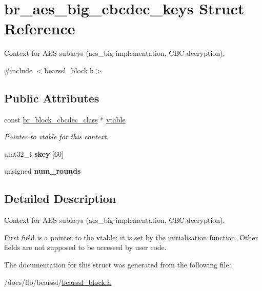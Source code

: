 \hypertarget{structbr__aes__big__cbcdec__keys}{}\section{br\+\_\+aes\+\_\+big\+\_\+cbcdec\+\_\+keys Struct Reference}
\label{structbr__aes__big__cbcdec__keys}


Context for A\+ES subkeys ({\ttfamily aes\+\_\+big} implementation, C\+BC decryption).  




{\ttfamily \#include $<$bearssl\+\_\+block.\+h$>$}

\subsection*{Public Attributes}
\begin{DoxyCompactItemize}
\item 
\mbox{\label{structbr__aes__big__cbcdec__keys_a379ffc6c76c3bcd68b976e460734a8a3}} 
const \hyperlink{bearssl__block_8h_a5542970c820eeee2e62766368be8fb7f}{br\+\_\+block\+\_\+cbcdec\+\_\+class} $\ast$ \hyperlink{structbr__aes__big__cbcdec__keys_a379ffc6c76c3bcd68b976e460734a8a3}{vtable}
\begin{DoxyCompactList}\small\item\em Pointer to vtable for this context. \end{DoxyCompactList}\item 
\mbox{\label{structbr__aes__big__cbcdec__keys_a2533d2054903920cfa6f312648004a74}} 
uint32\+\_\+t {\bfseries skey} \mbox{[}60\mbox{]}
\item 
\mbox{\label{structbr__aes__big__cbcdec__keys_aa7d5cf29a176319c68ce96da9695e63b}} 
unsigned {\bfseries num\+\_\+rounds}
\end{DoxyCompactItemize}


\subsection{Detailed Description}
Context for A\+ES subkeys ({\ttfamily aes\+\_\+big} implementation, C\+BC decryption). 

First field is a pointer to the vtable; it is set by the initialisation function. Other fields are not supposed to be accessed by user code. 

The documentation for this struct was generated from the following file\+:\begin{DoxyCompactItemize}
\item 
/docs/lib/bearssl/\hyperlink{bearssl__block_8h}{bearssl\+\_\+block.\+h}\end{DoxyCompactItemize}
